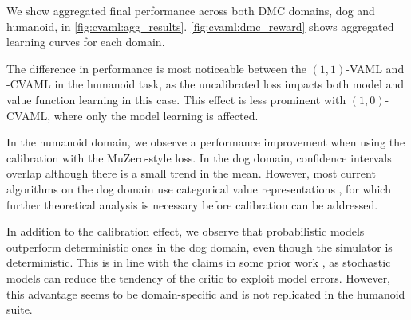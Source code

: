 We show aggregated final performance across both DMC domains, dog and humanoid, in \autoref{fig:cvaml:agg_results}.
\autoref{fig:cvaml:dmc_reward} shows aggregated learning curves for each domain.

The difference in performance is most noticeable between the $(1,1)$-VAML and -CVAML in the humanoid task, as the uncalibrated loss impacts both model and value function learning in this case. 
This effect is less prominent with $(1,0)$-CVAML, where only the model learning is affected.

In the humanoid domain, we observe a performance improvement when using the calibration with the MuZero-style loss.
In the dog domain, confidence intervals overlap although there is a small trend in the mean.
However, most current algorithms on the dog domain use categorical value representations \parencite{farebrother2024stop}, for which further theoretical analysis is necessary before calibration can be addressed.

In addition to the calibration effect, we observe that probabilistic models outperform deterministic ones in the dog domain, even though the simulator is deterministic.
This is in line with the claims in some prior work \parencite{pets,janner2019mbpo}, as stochastic models can reduce the tendency of the critic to exploit model errors.
However, this advantage seems to be domain-specific and is not replicated in the humanoid suite.

